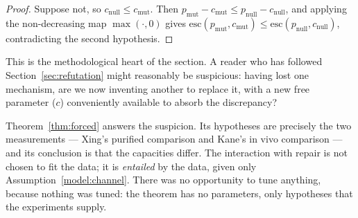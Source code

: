 \begin{proof}
Suppose not, so $c_{\mathrm{null}} \le c_{\mathrm{mut}}$. Then
$p_{\mathrm{mut}} - c_{\mathrm{mut}} \le p_{\mathrm{null}} - c_{\mathrm{null}}$,
and applying the non-decreasing map $\max(\cdot, 0)$ gives
$\mathrm{esc}(p_{\mathrm{mut}}, c_{\mathrm{mut}}) \le \mathrm{esc}(p_{\mathrm{null}}, c_{\mathrm{null}})$,
contradicting the second hypothesis.
\end{proof}

\begin{remark}\label{rem:forced}
This is the methodological heart of the section. A reader who has followed
Section~\ref{sec:refutation} might reasonably be suspicious: having lost one
mechanism, are we now inventing another to replace it, with a new free parameter
($c$) conveniently available to absorb the discrepancy?

Theorem~\ref{thm:forced} answers the suspicion. Its hypotheses are precisely the
two measurements --- Xing's purified comparison and Kane's in vivo comparison ---
and its conclusion is that the capacities differ. The interaction with repair is
not chosen to fit the data; it is \emph{entailed} by the data, given only
Assumption~\ref{model:channel}. There was no opportunity to tune anything,
because nothing was tuned: the theorem has no parameters, only hypotheses that
the experiments supply.
\end{remark}

